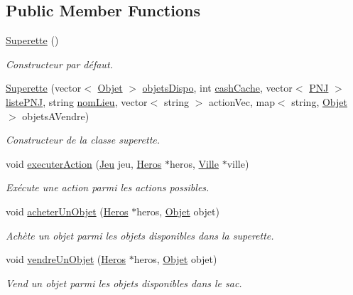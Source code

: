 \subsection*{Public Member Functions}
\begin{DoxyCompactItemize}
\item 
\hyperlink{class_superette_a83beb054a37acf78f325a11e679d06c6}{Superette} ()
\begin{DoxyCompactList}\small\item\em Constructeur par défaut. \end{DoxyCompactList}\item 
\hyperlink{class_superette_af6ecf322ce825777c01851e8b64b9f1c}{Superette} (vector$<$ \hyperlink{class_objet}{Objet} $>$ \hyperlink{class_lieu_a3a65fbb8ecba3f2e265905730ad2e631}{objets\-Dispo}, int \hyperlink{class_lieu_a90b76b521f92a43626ccd29ed5a29f89}{cash\-Cache}, vector$<$ \hyperlink{class_p_n_j}{P\-N\-J} $>$ \hyperlink{class_lieu_a8c1e20b105f7972f22d8f16651de4ebd}{liste\-P\-N\-J}, string \hyperlink{class_lieu_a1e48889fe5c581f043b8bd77ca497fc7}{nom\-Lieu}, vector$<$ string $>$ action\-Vec, map$<$ string, \hyperlink{class_objet}{Objet} $>$ objets\-A\-Vendre)
\begin{DoxyCompactList}\small\item\em Constructeur de la classe superette. \end{DoxyCompactList}\item 
void \hyperlink{class_superette_a6c9124730932bbf721149f5167c0611d}{executer\-Action} (\hyperlink{class_jeu}{Jeu} jeu, \hyperlink{class_heros}{Heros} $\ast$heros, \hyperlink{class_ville}{Ville} $\ast$ville)
\begin{DoxyCompactList}\small\item\em Exécute une action parmi les actions possibles. \end{DoxyCompactList}\item 
void \hyperlink{class_superette_a03c5890e470b71e24e59e2b018286a18}{acheter\-Un\-Objet} (\hyperlink{class_heros}{Heros} $\ast$heros, \hyperlink{class_objet}{Objet} objet)
\begin{DoxyCompactList}\small\item\em Achète un objet parmi les objets disponibles dans la superette. \end{DoxyCompactList}\item 
void \hyperlink{class_superette_a4d3c1ec385b042f8cd59f7e592a134f2}{vendre\-Un\-Objet} (\hyperlink{class_heros}{Heros} $\ast$heros, \hyperlink{class_objet}{Objet} objet)
\begin{DoxyCompactList}\small\item\em Vend un objet parmi les objets disponibles dans le sac. \end{DoxyCompactList}\item 

\end{DoxyCompactItemize}
